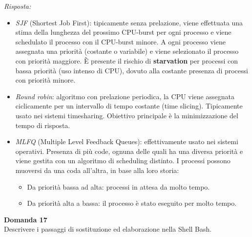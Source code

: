 \documentclass{article}
\newenvironment{problem}[2][Domanda]
    { \begin{mdframed}[backgroundcolor=gray!20] \textbf{#1 #2} \\}
    {  \end{mdframed}}
\newenvironment{solution}
    {\textit{Risposta:}}
    {}
\begin{document}
\begin{solution}
\begin{itemize}
    \item \emph{SJF} (Shortest Job First): tipicamente senza prelazione, viene effettuata una stima della lunghezza del prossimo CPU-burst per ogni processo e viene schedulato il processo con il CPU-burst minore.
    \newline
    A ogni processo viene assegnata una priorità (costante o variabile) e viene selezionato il processo con priorità maggiore.
    \newline
    È presente il rischio di \textbf{starvation} per processi con bassa priorità (uso intenso di CPU), dovuto alla costante presenza di processi con priorità minore.
    
    \item \emph{Round robin}: algoritmo con prelazione periodica, la CPU viene assegnata ciclicamente per un intervallo di tempo costante (time slicing).
    \newline
    Tipicamente usato nei sistemi timesharing.
    \newline
    Obiettivo principale è la minimizzazione del tempo di risposta.
    
    \item \emph{MLFQ} (Multiple Level Feedback Queues): effettivamente usato nei sistemi operativi.
    \newline
    Presenza di più code, ognuna delle quali ha una diversa priorità e viene gestita con un algoritmo di scheduling distinto.
    \newline
    I processi possono muoversi da una coda all’altra, in base alla loro storia:
    \begin{itemize}
        \item Da priorità bassa ad alta: processi in attesa da molto tempo.
        \item Da priorità alta a bassa: il processo è stato eseguito per molto tempo.
    \end{itemize}
\end{itemize} 
\end{solution}
\begin{problem}{17}
Descrivere i passaggi di sostituzione ed elaborazione nella Shell Bash.
\end{problem}
\end{document}
